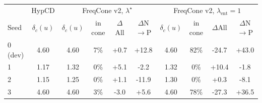 \begin{tabular}{lc|cccc|cccc}
\toprule
 & HypCD & \multicolumn{4}{c|}{FreqCone v2, $\lambda^\star$} & \multicolumn{4}{c}{FreqCone v2, $\lambda_{\mathrm{ent}}{=}1$} \\
Seed & $\delta_c(u)$ & $\delta_c(u)$ & in cone & $\Delta$All & $\Delta$N$\to$P & $\delta_c(u)$ & in cone & $\Delta$All & $\Delta$N$\to$P \\
\midrule
0 (dev) & 4.60 & 4.60 & 7\% & +0.7 & +12.8 & 4.60 & 82\% & -24.7 & +43.0 \\
1 & 1.17 & 1.32 & 0\% & +5.1 & -2.2 & 1.32 & 0\% & +10.4 & -1.8 \\
2 & 1.15 & 1.25 & 0\% & +1.1 & -11.9 & 1.30 & 0\% & +0.3 & -8.1 \\
3 & 4.60 & 4.60 & 3\% & -3.0 & +5.6 & 4.60 & 78\% & -27.3 & +36.5 \\
\bottomrule
\end{tabular}
